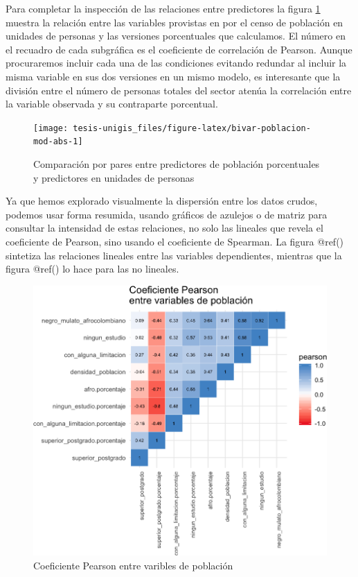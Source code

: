\documentclass[12pt,]{book}
\begin{document}
Para completar la inspección de las relaciones entre predictores la
figura \ref{fig:bivar-poblacion-mod-abs} muestra la relación entre las
variables provistas en por el censo de población en unidades de personas
y las versiones porcentuales que calculamos. El número en el recuadro de
cada subgráfica es el coeficiente de correlación de Pearson. Aunque
procuraremos incluir cada una de las condiciones evitando redundar al
incluir la misma variable en sus dos versiones en un mismo modelo, es
interesante que la división entre el número de personas totales del
sector atenúa la correlación entre la variable observada y su
contraparte porcentual.

\begin{figure}
\texttt{[image: tesis-unigis\_files/figure-latex/bivar-poblacion-mod-abs-1]} \caption{Comparación por pares entre predictores de población porcentuales y predictores en unidades de personas}\label{fig:bivar-poblacion-mod-abs}
\end{figure}

Ya que hemos explorado visualmente la dispersión entre los datos crudos,
podemos usar forma resumida, usando gráficos de azulejos o de matriz
para consultar la intensidad de estas relaciones, no solo las lineales
que revela el coeficiente de Pearson, sino usando el coeficiente de
Spearman. La figura @ref() sintetiza las relaciones lineales entre las
variables dependientes, mientras que la figura @ref() lo hace para las
no lineales.

\begin{figure}
\includegraphics[width=1\linewidth]{tesis-unigis_files/figure-latex/tile-poblacion-pearson-1} \caption{Coeficiente Pearson entre varibles de población}\label{fig:tile-poblacion-pearson}
\end{figure}
\end{document}
